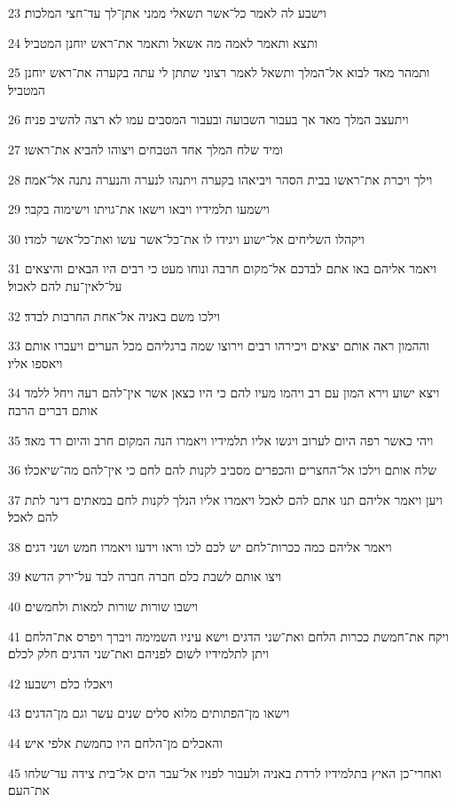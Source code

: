 \par 23 וישבע לה לאמר כל־אשר תשאלי ממני אתן־לך עד־חצי המלכות׃
\par 24 ותצא ותאמר לאמה מה אשאל ותאמר את־ראש יוחנן המטביל׃
\par 25 ותמהר מאד לבוא אל־המלך ותשאל לאמר רצוני שתתן לי עתה בקערה את־ראש יוחנן המטביל׃
\par 26 ויתעצב המלך מאד אך בעבור השבועה ובעבור המסבים עמו לא רצה להשיב פניה׃
\par 27 ומיד שלח המלך אחד הטבחים ויצוהו להביא את־ראשו׃
\par 28 וילך ויכרת את־ראשו בבית הסהר ויביאהו בקערה ויתנהו לנערה והנערה נתנה אל־אמה׃
\par 29 וישמעו תלמידיו ויבאו וישאו את־גויתו וישימוה בקבר׃
\par 30 ויקהלו השליחים אל־ישוע ויגידו לו את־כל־אשר עשו ואת־כל־אשר למדו׃
\par 31 ויאמר אליהם באו אתם לבדכם אל־מקום חרבה ונוחו מעט כי רבים היו הבאים והיצאים על־לאין־עת להם לאכול׃
\par 32 וילכו משם באניה אל־אחת החרבות לבדד׃
\par 33 וההמון ראה אותם יצאים ויכירהו רבים וירוצו שמה ברגליהם מכל הערים ויעברו אותם ויאספו אליו׃
\par 34 ויצא ישוע וירא המון עם רב ויהמו מעיו להם כי היו כצאן אשר אין־להם רעה ויחל ללמד אותם דברים הרבה׃
\par 35 ויהי כאשר רפה היום לערוב ויגשו אליו תלמידיו ויאמרו הנה המקום חרב והיום רד מאד׃
\par 36 שלח אותם וילכו אל־החצרים והכפרים מסביב לקנות להם לחם כי אין־להם מה־שיאכלו׃
\par 37 ויען ויאמר אליהם תנו אתם להם לאכל ויאמרו אליו הנלך לקנות לחם במאתים דינר לתת להם לאכל׃
\par 38 ויאמר אליהם כמה ככרות־לחם יש לכם לכו וראו וידעו ויאמרו חמש ושני דגים׃
\par 39 ויצו אותם לשבת כלם חברה חברה לבד על־ירק הדשא׃
\par 40 וישבו שורות שורות למאות ולחמשים׃
\par 41 ויקח את־חמשת ככרות הלחם ואת־שני הדגים וישא עיניו השמימה ויברך ויפרס את־הלחם ויתן לתלמידיו לשום לפניהם ואת־שני הדגים חלק לכלם׃
\par 42 ויאכלו כלם וישבעו׃
\par 43 וישאו מן־הפתותים מלוא סלים שנים עשר וגם מן־הדגים׃
\par 44 והאכלים מן־הלחם היו כחמשת אלפי איש׃
\par 45 ואחרי־כן האיץ בתלמידיו לרדת באניה ולעבור לפניו אל־עבר הים אל־בית צידה עד־שלחו את־העם׃
